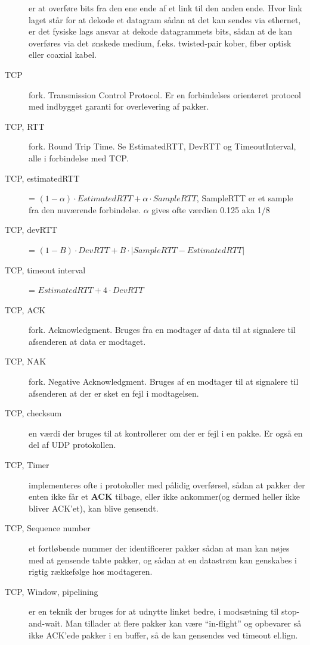 \documentclass[10pt]{article}
\begin{document}
\begin{description}
    er at overføre bits fra den ene ende af et link til den anden ende. Hvor
    link laget står for at dekode et datagram sådan at det kan sendes via
    ethernet, er det fysiske lags ansvar at dekode datagrammets bits, sådan at
    de kan overføres via det ønskede medium, f.eks. twisted-pair kober, fiber
    optisk eller coaxial kabel.
\item[TCP] fork. Transmission Control Protocol. Er en forbindelses orienteret
    protocol med indbygget garanti for overlevering af pakker.
\item[TCP, RTT] fork. Round Trip Time. Se EstimatedRTT, DevRTT og TimeoutInterval,
    alle i forbindelse med TCP.
\item[TCP, estimatedRTT] = $(1-\alpha) \cdot EstimatedRTT + \alpha \cdot SampleRTT$,
    SampleRTT er et sample fra den nuværende forbindelse. $\alpha$ gives ofte
    værdien 0.125 aka 1/8
\item[TCP, devRTT] = $(1-B) \cdot DevRTT + B \cdot | SampleRTT - EstimatedRTT |$
\item[TCP, timeout interval] = $EstimatedRTT + 4 \cdot DevRTT$
\item[TCP, ACK] fork. Acknowledgment. Bruges fra en modtager af data til at
    signalere til afsenderen at data er modtaget.
\item[TCP, NAK] fork. Negative Acknowledgment. Bruges af en modtager til at
    signalere til afsenderen at der er sket en fejl i modtagelsen.
\item[TCP, checksum] en værdi der bruges til at kontrollerer om der er fejl i en
    pakke. Er også en del af UDP protokollen.
\item[TCP, Timer] implementeres ofte i protokoller med pålidig overførsel,
    sådan at pakker der enten ikke får et \textbf{ACK} tilbage, eller ikke
    ankommer(og dermed heller ikke bliver ACK'et), kan blive gensendt.
\item[TCP, Sequence number] et fortløbende nummer der identificerer pakker
    sådan at man kan nøjes med at gensende tabte pakker, og sådan at en
    datastrøm kan genskabes i rigtig rækkefølge hos modtageren.
\item[TCP, Window, pipelining] er en teknik der bruges for at udnytte linket
    bedre, i modsætning til stop-and-wait. Man tillader at flere pakker kan
    være ``in-flight'' og opbevarer så ikke ACK'ede pakker i en buffer, så de
    kan gensendes ved timeout el.lign.

\end{description}
\end{document}
